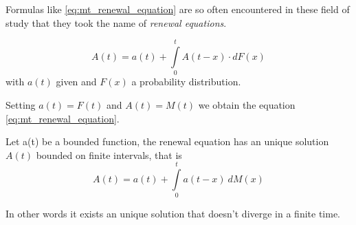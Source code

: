 \begin{definition}
	Formulas like \ref{eq:mt_renewal_equation} are so often encountered in these field of study that they took the name of \emph{renewal equations}.

	\begin{equation} \label{eq:renewal_equation}
			A(t) = a(t) +\int\limits_0^{t}A(t-x) \cdot dF(x)
	\end{equation}
	with $a(t)$ given and $F(x)$ a probability distribution.

	Setting $a(t) = F(t)$ and $A(t) = M(t)$ we obtain the equation \ref{eq:mt_renewal_equation}.
\end{definition}

\begin{theorem}[4.1 K.T. p.184]
	Let a(t) be a bounded function, the renewal equation has an unique solution $A(t)$ bounded on finite intervals, that is
	\begin{equation} \label{eq:renewal_solution}
		A(t) = a(t) + \int\limits_0^{t} a(t-x) ~ dM(x)
	\end{equation}
\end{theorem}
In other words it exists an unique solution that doesn't diverge in a finite time.
